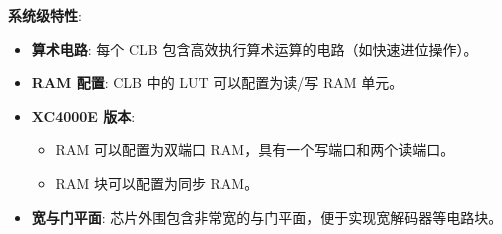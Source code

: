 \begin{frame}{\textbf{系统级特性}:}
\label{ux7cfbux7edfux7ea7ux7279ux6027}
\begin{itemize}
\tightlist
\item
    \textbf{算术电路}: 每个 CLB
    包含高效执行算术运算的电路（如快速进位操作）。
\item
    \textbf{RAM 配置}: CLB 中的 LUT 可以配置为读/写 RAM 单元。
\item
    \textbf{XC4000E 版本}:

    \begin{itemize}
    \tightlist
    \item
    RAM 可以配置为双端口 RAM，具有一个写端口和两个读端口。
    \item
    RAM 块可以配置为同步 RAM。
    \end{itemize}
\item
    \textbf{宽与门平面}:
    芯片外围包含非常宽的与门平面，便于实现宽解码器等电路块。
\end{itemize}
\end{frame}


